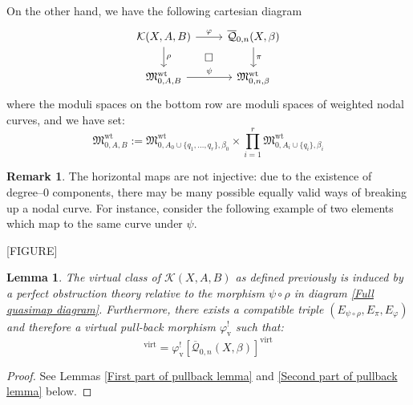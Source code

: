\documentclass[11pt]{amsart}
\newcommand{\Q}[4]{\overline{\mathcal Q}_{#1,#2}(#3,#4)}
\newcommand{\MM}{\mathfrak M}
\newcommand{\virt}[1]{[#1]^{\operatorname{virt}}}
\theoremstyle{plain}
\newtheorem{lemma}[thm]{Lemma}
\theoremstyle{definition}
\newtheorem{remark}[thm]{Remark}
\begin{document}
On the other hand, we have the following cartesian diagram
\begin{equation} \label{Full quasimap diagram}
\begin{tikzcd}
\mathcal{K}(X,A,B) \ar[r,"\varphi"] \ar[d,"\rho"] \ar[rd,phantom,"\square"] & \Q{0}{n}{X}{\beta} \ar[d,"\pi"] \\
\MM_{0,A,B}^{\operatorname{wt}} \ar[r,"\psi"] & \MM_{0,n,\beta}^{\operatorname{wt}}
\end{tikzcd}
\end{equation}
where the moduli spaces on the bottom row are moduli spaces of weighted nodal curves, and we have set:
\begin{equation*} \MM_{0,A,B}^{\operatorname{wt}} := \MM_{0,A_0\cup\{q_1,\ldots,q_r\},\beta_0}^{\operatorname{wt}} \times \prod_{i=1}^r \MM_{0,A_i\cup\{q_i\},\beta_i}^{\operatorname{wt}} \end{equation*}

\begin{remark} The horizontal maps are not injective: due to the existence of degree--$0$ components, there may be many possible equally valid ways of breaking up a nodal curve. For instance, consider the following example of two elements which map to the same curve under $\psi$.

[FIGURE]
\end{remark}

\begin{lemma} \label{Lemma product class equals pullback class} The virtual class of $\mathcal{K}(X,A,B)$ as defined previously is induced by a perfect obstruction theory relative to the morphism $\psi \circ \rho$ in diagram \eqref{Full quasimap diagram}. Furthermore, there exists a compatible triple $(E_{\psi \circ \rho}, E_{\pi}, E_{\varphi})$ and therefore a virtual pull-back morphism $\varphi_{\text{v}}^!$ such that:
\begin{equation*} \virt{\mathcal{K}(X,A,B)} = \varphi_{\text{v}}^! \virt{\Q{0}{n}{X}{\beta}} \end{equation*} \end{lemma}
\begin{proof} See Lemmas \ref{First part of pullback lemma} and \ref{Second part of pullback lemma} below. \end{proof}
\end{document}
